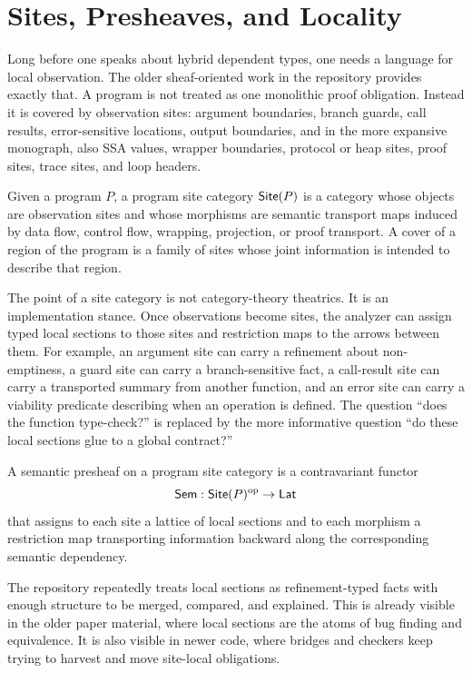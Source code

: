 \chapter{Sites, Presheaves, and Locality}

Long before one speaks about hybrid dependent types, one needs a language for local
observation. The older sheaf-oriented work in the repository provides exactly that. A
program is not treated as one monolithic proof obligation. Instead it is covered by
observation sites: argument boundaries, branch guards, call results, error-sensitive
locations, output boundaries, and in the more expansive monograph, also SSA values,
wrapper boundaries, protocol or heap sites, proof sites, trace sites, and loop headers.

\begin{definition}
Given a program $P$, a program site category $\mathsf{Site}(P)$ is a category whose objects are
observation sites and whose morphisms are semantic transport maps induced by data flow,
control flow, wrapping, projection, or proof transport. A cover of a region of the
program is a family of sites whose joint information is intended to describe that region.
\end{definition}

The point of a site category is not category-theory theatrics. It is an implementation
stance. Once observations become sites, the analyzer can assign typed local sections to
those sites and restriction maps to the arrows between them. For example, an argument site
can carry a refinement about non-emptiness, a guard site can carry a branch-sensitive
fact, a call-result site can carry a transported summary from another function, and an
error site can carry a viability predicate describing when an operation is defined. The
question ``does the function type-check?'' is replaced by the more informative question
``do these local sections glue to a global contract?''

\begin{definition}
A semantic presheaf on a program site category is a contravariant functor
\[
  \mathsf{Sem} : \mathsf{Site}(P)^{\mathrm{op}} \to \mathsf{Lat}
\]
that assigns to each site a lattice of local sections and to each morphism a restriction
map transporting information backward along the corresponding semantic dependency.
\end{definition}

The repository repeatedly treats local sections as refinement-typed facts with enough
structure to be merged, compared, and explained. This is already visible in the older
paper material, where local sections are the atoms of bug finding and equivalence. It is
also visible in newer code, where bridges and checkers keep trying to harvest and move
site-local obligations.

